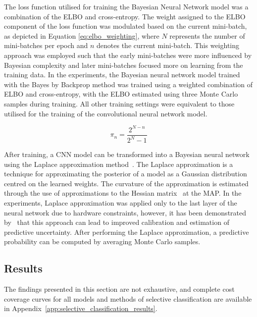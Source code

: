 The loss function utilised for training the Bayesian Neural Network model was a combination of the ELBO and cross-entropy. The weight assigned to the ELBO component of the loss function was modulated based on the current mini-batch, as depicted in Equation \ref{eq:elbo_weighting}, where $N$ represents the number of mini-batches per epoch and $n$ denotes the current mini-batch. This weighting approach was employed such that the early mini-batches were more influenced by Bayesian complexity and later mini-batches focused more on learning from the training data. In the experiments, the Bayesian neural network model trained with the Bayes by Backprop method was trained using a weighted combination of ELBO and cross-entropy, with the ELBO estimated using three Monte Carlo samples during training. All other training settings were equivalent to those utilised for the training of the convolutional neural network model.

\begin{equation}
	\pi_n = \frac{2^{N-n}}{2^N-1}
	\label{eq:elbo_weighting}
\end{equation}

After training, a CNN model can be transformed into a Bayesian neural network using the Laplace approximation method~\citep{mackay1992bayesian}. The Laplace approximation is a technique for approximating the posterior of a model as a Gaussian distribution centred on the learned weights. The curvature of the approximation is estimated through the use of approximations to the Hessian matrix~\citep{botev2017practical} at the MAP. In the experiments, Laplace approximation was applied only to the last layer of the neural network due to hardware constraints, however, it has been demonstrated by~\cite{kristiadi2020being} that this approach can lead to improved calibration and estimation of predictive uncertainty. After performing the Laplace approximation, a predictive probability can be computed by averaging Monte Carlo samples.


\subsection{Results}
The findings presented in this section are not exhaustive, and complete cost coverage curves for all models and methods of selective classification are available in Appendix~\ref{app:selective_classification_results}.

